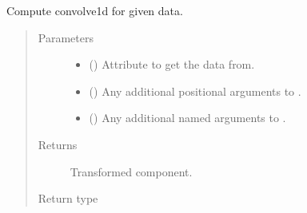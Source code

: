 \documentclass[letterpaper,10pt,english]{sphinxmanual}
\begin{document}
\begin{fulllineitems}
\begin{fulllineitems}
\label{\detokenize{api/base_classes:geology.src.base_spatial.SpatialComponent.convolve1d}}
Compute convolve1d for given data.
\begin{quote}\begin{description}
\item[{Parameters}] \leavevmode\begin{itemize}
\item {} 
 (\sphinxstyleliteralemphasis{\sphinxupquote{, }}) \textendash{} Attribute to get the data from.

\item {} 
 () \textendash{} Any additional positional arguments to .

\item {} 
 () \textendash{} Any additional named arguments to .

\end{itemize}

\item[{Returns}] \leavevmode
{} \textendash{} Transformed component.

\item[{Return type}] \leavevmode
{\hyperref[\detokenize{api/base_classes:geology.src.base_spatial.SpatialComponent}]{}}

\end{description}\end{quote}

\end{fulllineitems}



\end{fulllineitems}
\end{document}
